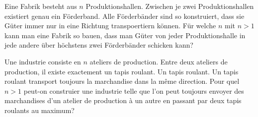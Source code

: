 Eine Fabrik besteht aus $n$ Produktionshallen. Zwischen je zwei Produktionshallen existiert genau ein Förderband. Alle Förderbänder sind so konstruiert, dass sie Güter immer nur in eine Richtung transpoertiern können. Für welche $n$ mit $n>1$ kann man eine Fabrik so bauen, dass man Güter von jeder Produktionshalle in jede andere über höchstens zwei Förderbänder schicken kann?

\bigskip

Une industrie consiste en $n$ ateliers de production. Entre deux ateliers de production, il existe exactement un tapis roulant. Un tapis roulant. Un tapis roulant transport toujours la marchandise dans la même direction. Pour quel $n > 1$ peut-on construier une industrie telle que l'on peut toujours envoyer des marchandises d'un atelier de production à un autre en passant par deux tapis roulants au maximum?